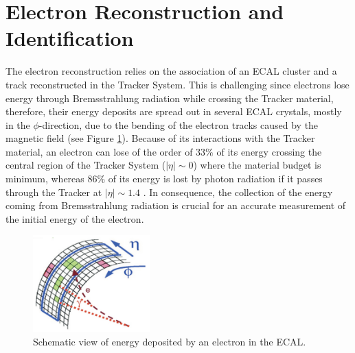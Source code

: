  

\section{Electron Reconstruction and Identification}
\label{sec:Electron}

\noindent The electron reconstruction relies on the association of an ECAL cluster
and a track reconstructed in the Tracker System. This is challenging 
since electrons lose energy through Bremsstrahlung radiation
while crossing the Tracker material, therefore, their energy deposits are 
spread out in several ECAL crystals, mostly in the $\phi$-direction,
due to the bending of the electron tracks caused by the magnetic 
field (see Figure \ref{fig:ElectronScketch}). Because of its
interactions with the Tracker material, an electron can lose of the order of 33$\%$ of its 
energy crossing the central region of the Tracker System ($|\eta| \sim 0$) where 
the material budget is minimum, whereas 86$\%$ of its energy is 
lost by photon radiation if it passes through the Tracker at $|\eta| \sim 1.4$ \cite{ElectronID8TeV}. In 
consequence, the collection of the energy coming from Bremsstrahlung radiation is crucial for an accurate 
measurement of the initial energy of the electron. \\


\begin{figure}[ht]
  \begin{center}
    \includegraphics[width=0.4\textwidth]{figuras/Chapter3/ElectronCluster.png}
    \caption{Schematic view of energy deposited by an electron in the ECAL.}
    \label{fig:ElectronScketch}
  \end{center}
\end{figure}


